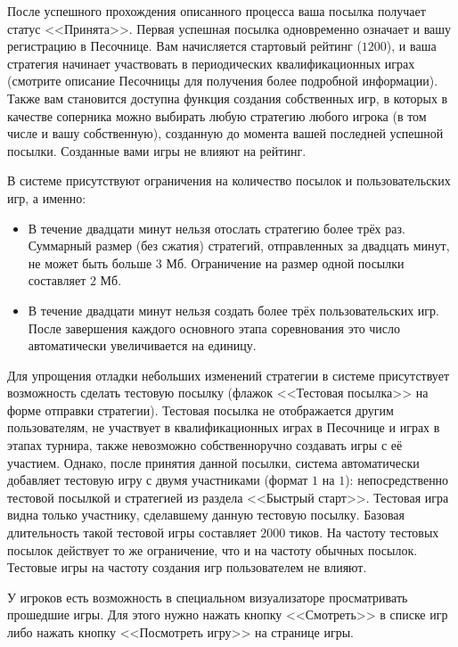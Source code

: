 После успешного прохождения описанного процесса ваша посылка получает статус <<Принята>>. Первая успешная посылка одновременно означает и
вашу регистрацию в Песочнице. Вам начисляется стартовый рейтинг ($1200$), и ваша стратегия начинает участвовать в периодических
квалификационных играх (смотрите описание Песочницы для получения более подробной информации). Также вам становится доступна функция
создания собственных игр, в которых в качестве соперника можно выбирать любую стратегию любого игрока (в том числе и вашу собственную),
созданную до момента вашей последней успешной посылки. Созданные вами игры не влияют на рейтинг.

В системе присутствуют ограничения на количество посылок и пользовательских игр, а именно:
\vspace{-0.15in}
\begin{itemize}
  \item В течение двадцати минут нельзя отослать стратегию более трёх раз. Суммарный размер (без сжатия) стратегий, отправленных за двадцать
        минут, не может быть больше 3 Мб. Ограничение на размер одной посылки составляет 2 Мб.
\vspace{-0.10in}
  \item В течение двадцати минут нельзя создать более трёх пользовательских игр. После завершения каждого основного этапа соревнования это
        число автоматически увеличивается на единицу.
\vspace{-0.10in}
\end{itemize}

Для упрощения отладки небольших изменений стратегии в системе присутствует возможность сделать тестовую посылку (флажок <<Тестовая посылка>>
на форме отправки стратегии). Тестовая посылка не отображается другим пользователям, не участвует в квалификационных играх в Песочнице и
играх в этапах турнира, также невозможно собственноручно создавать игры с её участием. Однако, после принятия данной посылки, система
автоматически добавляет тестовую игру с двумя участниками (формат $1$ на $1$): непосредственно тестовой посылкой и стратегией из раздела
<<Быстрый старт>>. Тестовая игра видна только участнику, сделавшему данную тестовую посылку. Базовая длительность такой тестовой игры
составляет $2000$ тиков. На частоту тестовых посылок действует то же ограничение, что и на частоту обычных посылок. Тестовые игры на частоту
создания игр пользователем не влияют.

У игроков есть возможность в специальном визуализаторе просматривать прошедшие игры. Для этого нужно нажать кнопку <<Смотреть>> в списке игр
либо нажать кнопку <<Посмотреть игру>> на странице игры.

